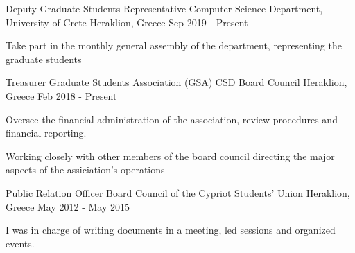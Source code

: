 

\begin{cventries}

  \cventry
    {Deputy Graduate Students Representative} %
    {Computer Science Department, University of Crete} %
    {Heraklion, Greece} %
    {Sep 2019 - Present} %
    {
      \begin{cvitems} %
      \item{Take part in the monthly general assembly of the
          department, representing the graduate students}
      \end{cvitems}
    }

  \cventry
    {Treasurer} %
    {Graduate Students Association (GSA) CSD Board Council} %
    {Heraklion, Greece} %
    {Feb 2018 - Present} %
    {
      \begin{cvitems} %
      \item{Oversee the financial administration of the association,
          review procedures and financial reporting.}
      \item{Working closely with other members of the board council
          directing the major aspects of the assiciation's operations}
      \end{cvitems}
    }

  \cventry
    {Public Relation Officer} %
    {Board Council of the Cypriot Students' Union} %
    {Heraklion, Greece} %
    {May 2012 - May 2015} %
    {
      \begin{cvitems} %
      \item{I was in charge of writing documents in a meeting, led
          sessions and organized events.}
      \end{cvitems}
    }

\end{cventries}
